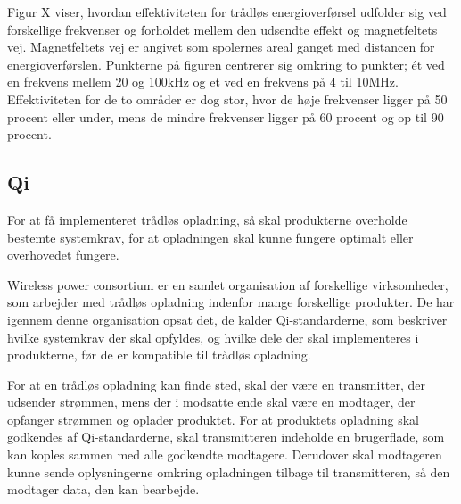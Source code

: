 Figur X viser, hvordan effektiviteten for trådløs energioverførsel udfolder sig ved forskellige frekvenser og forholdet mellem den udsendte effekt og magnetfeltets vej. Magnetfeltets vej er angivet som spolernes areal ganget med distancen for energioverførslen. Punkterne på figuren centrerer sig omkring to punkter; ét ved en frekvens mellem 20 og 100kHz og et ved en frekvens på 4 til 10MHz. Effektiviteten for de to områder er dog stor, hvor de høje frekvenser ligger på 50 procent eller under, mens de mindre frekvenser ligger på 60 procent og op til 90 procent.

\subsection{Qi}
For at få implementeret trådløs opladning, så skal produkterne overholde bestemte systemkrav, for at opladningen skal kunne fungere optimalt eller overhovedet fungere.

Wireless power consortium er en samlet organisation af forskellige virksomheder, som arbejder med trådløs opladning indenfor mange forskellige produkter. De har igennem denne organisation opsat det, de kalder Qi-standarderne, som beskriver hvilke systemkrav der skal opfyldes, og hvilke dele der skal implementeres i produkterne, før de er kompatible til trådløs opladning.

For at en trådløs opladning kan finde sted, skal der være en transmitter, der udsender strømmen, mens der i modsatte ende skal være en modtager, der opfanger strømmen og oplader produktet. For at produktets opladning skal godkendes af Qi-standarderne, skal transmitteren indeholde en brugerflade, som kan koples sammen med alle godkendte modtagere. Derudover skal modtageren kunne sende oplysningerne omkring opladningen tilbage til transmitteren, så den modtager data, den kan bearbejde.
